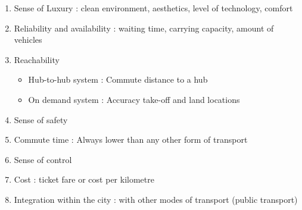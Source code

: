 \begin{enumerate}[nolistsep]
    \item Sense of Luxury : clean environment, aesthetics, level of technology, comfort
    \item Reliability and availability : waiting time, carrying capacity, amount of vehicles 
    \item Reachability 
    \begin{itemize}
        \item Hub-to-hub system : Commute distance to a hub  
        \item On demand system : Accuracy take-off and land locations
    \end{itemize}
    \item Sense of safety
    \item Commute time : Always lower than any other form of transport
    \item Sense of control
    \item Cost : ticket fare or cost per kilometre
    \item Integration within the city : with other modes of transport (public transport)
\end{enumerate}


